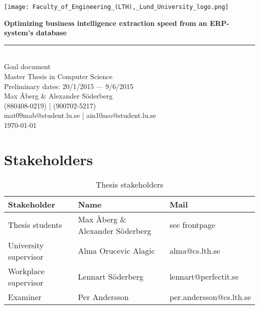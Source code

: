 \documentclass[12pt,a4paper]{article}
\newcommand{\HRule}{\rule{\linewidth}{0.5mm}}
\begin{document}
	\begin{titlepage}
  	\vspace*{3\baselineskip}
    \begin{center}
    	\begin{center}
    \texttt{[image: Faculty\_of\_Engineering\_(LTH),\_Lund\_University\_logo.png]}
    	\end{center}
    \vspace*{3\baselineskip}
    \large
    \bfseries
   \Huge
   Optimizing business intelligence extraction speed from an ERP-system's database
   \HRule\\
       \normalfont
          \LARGE
          Goal document \\
            \normalsize
            \vspace*{1\baselineskip}
      Master Thesis in  Computer Science\\
      \vspace*{4\baselineskip}
      Preliminary dates: 20/1/2015 --- 9/6/2015\\
      \vspace*{6\baselineskip}
    Max Åberg  \& Alexander Söderberg\\
    (880408-0219) | (900702-5217) \\
    mat09mab@student.lu.se | ain10aso@student.lu.se\\[2\baselineskip]
    \today \\[2\baselineskip]
    	\end{center}
    \end{titlepage}
    
\newpage

\vspace*{-2\baselineskip}

\section*{Stakeholders}
\begin{table}[H]
    \begin{tabular}{l|l|l}
    Stakeholder & Name & Mail \\\hline
    Thesis students & Max Åberg \& Alexander Söderberg & see frontpage \\\hline
    University supervisor & Alma Orucevic Alagic & alma@cs.lth.se\\\hline
    Workplace supervisor & Lennart Söderberg & lennart@perfectit.se\\\hline
    Examiner & Per Andersson & per.andersson@cs.lth.se 
    \end{tabular}
    \caption{Thesis stakeholders}
\end{table}
\end{document}
